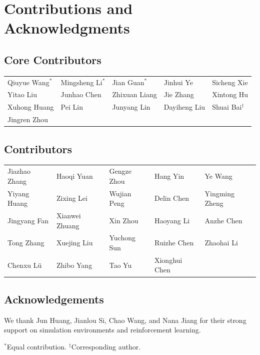 \documentclass{article}
\begin{document}
\section{Contributions and Acknowledgments}


\subsection*{Core Contributors}

\noindent
\begin{tabularx}{\textwidth}{@{}LLLLL@{}}
Qiuyue Wang$^{*}$ & Mingsheng Li$^{*}$ & Jian Guan$^{*}$ & Jinhui Ye & Sicheng Xie \\
Yitao Liu & Junhao Chen & Zhixuan Liang & Jie Zhang & Xintong Hu \\
Xuhong Huang & Pei Lin & Junyang Lin & Dayiheng Liu & Shuai Bai$^{\dagger}$ \\
Jingren Zhou & & & & \\
\end{tabularx}


\vspace{1.2em}

\subsection*{Contributors}

\noindent
\begin{tabularx}{\textwidth}{@{}LLLLL@{}}
Jiazhao Zhang & Haoqi Yuan & Gengze Zhou & Hang Yin & Ye Wang \\
Yiyang Huang & Zixing Lei & Wujian Peng & Delin Chen & Yingming Zheng \\
Jingyang Fan & Xianwei Zhuang & Xin Zhou & Haoyang Li & Anzhe Chen \\
Tong Zhang & Xuejing Liu & Yuchong Sun & Ruizhe Chen & Zhaohai Li \\
Chenxu L\"u & Zhibo Yang & Tao Yu & Xionghui Chen & \\
\end{tabularx}

\vspace{1.2em}

\subsection*{Acknowledgements}

We thank Jun Huang, Jianlou Si, Chao Wang, and Nana Jiang for their strong support on simulation environments and reinforcement learning. 

\vfill

\noindent
{\footnotesize
$^{*}$Equal contribution. \quad
$^{\dagger}$Corresponding author.
}




\appendix
\end{document}
